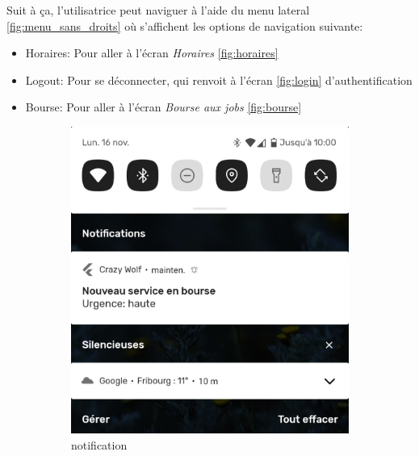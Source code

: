 Suit à ça, l'utilisatrice peut naviguer à l'aide du menu lateral \ref{fig:menu_sans_droits} où s'affichent les options
de navigation suivante: 
\begin{itemize}
    \item Horaires: Pour aller à l'écran \textit{Horaires} \ref{fig:horaires}
    \item Logout: Pour se déconnecter, qui renvoit à l'écran \ref{fig:login} d'authentification
    \item Bourse: Pour aller à l'écran \textit{Bourse aux jobs} \ref{fig:bourse}
\end{itemize}
\begin{figure}[!h]
    \begin{subfigure}[]{.3\textwidth}
        \centering
        \includegraphics[width=0.9\linewidth]{screenshots/scenario_02/notification.png}
        \caption{notification}
        \label{fig:notif}
    \end{subfigure}
    \centering
    \begin{subfigure}{.3\textwidth}
        \centering

\end{subfigure}
\end{figure}

